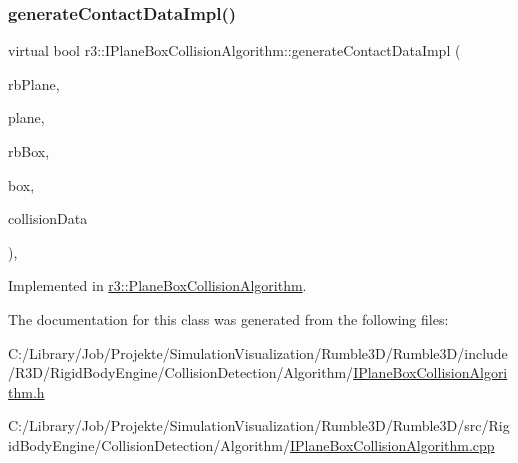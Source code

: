 \mbox{\label{classr3_1_1_i_plane_box_collision_algorithm_a48f6ca7613a0cc7c64d8e0cfe34674e8}} 
\subsubsection{\texorpdfstring{generate\+Contact\+Data\+Impl()}{generateContactDataImpl()}}
{\footnotesize\ttfamily virtual bool r3\+::\+I\+Plane\+Box\+Collision\+Algorithm\+::generate\+Contact\+Data\+Impl (\begin{DoxyParamCaption}\item[{\mbox{\hyperlink{classr3_1_1_rigid_body}{Rigid\+Body}} $\ast$}]{rb\+Plane,  }\item[{\mbox{\hyperlink{classr3_1_1_collision_plane}{Collision\+Plane}} $\ast$}]{plane,  }\item[{\mbox{\hyperlink{classr3_1_1_rigid_body}{Rigid\+Body}} $\ast$}]{rb\+Box,  }\item[{\mbox{\hyperlink{classr3_1_1_collision_box}{Collision\+Box}} $\ast$}]{box,  }\item[{\mbox{\hyperlink{classr3_1_1_collision_data}{Collision\+Data}} \&}]{collision\+Data }\end{DoxyParamCaption})\hspace{0.3cm}{\ttfamily [protected]}, {}}



Implemented in \mbox{\hyperlink{classr3_1_1_plane_box_collision_algorithm_a529c85973e9dab38e7427cdf9177d9ba}{r3\+::\+Plane\+Box\+Collision\+Algorithm}}.



The documentation for this class was generated from the following files\+:\begin{DoxyCompactItemize}
\item 
C\+:/\+Library/\+Job/\+Projekte/\+Simulation\+Visualization/\+Rumble3\+D/\+Rumble3\+D/include/\+R3\+D/\+Rigid\+Body\+Engine/\+Collision\+Detection/\+Algorithm/\mbox{\hyperlink{_i_plane_box_collision_algorithm_8h}{I\+Plane\+Box\+Collision\+Algorithm.\+h}}\item 
C\+:/\+Library/\+Job/\+Projekte/\+Simulation\+Visualization/\+Rumble3\+D/\+Rumble3\+D/src/\+Rigid\+Body\+Engine/\+Collision\+Detection/\+Algorithm/\mbox{\hyperlink{_i_plane_box_collision_algorithm_8cpp}{I\+Plane\+Box\+Collision\+Algorithm.\+cpp}}\end{DoxyCompactItemize}
